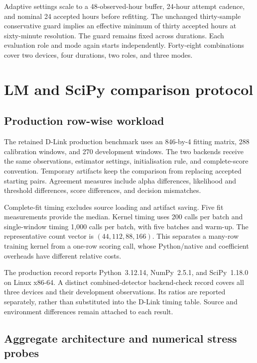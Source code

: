 Adaptive settings scale to a 48-observed-hour buffer, 24-hour attempt
cadence, and nominal 24 accepted hours before refitting. The unchanged
thirty-sample conservative guard implies an effective minimum of thirty
accepted hours at sixty-minute resolution. The guard remains fixed across
durations. Each evaluation role and mode again starts independently.
Forty-eight combinations cover two devices, four durations, two roles,
and three modes.

\section{LM and SciPy comparison protocol}
\label{sec:experimental-backends}

\subsection{Production row-wise workload}

The retained D-Link production benchmark uses an 846-by-4 fitting matrix,
288 calibration windows, and 270 development windows. The two backends
receive the same observations, estimator settings, initialisation rule,
and complete-score convention. Temporary artifacts keep the comparison
from replacing accepted starting pairs. Agreement measures include
alpha differences, likelihood and threshold differences, score
differences, and decision mismatches.

Complete-fit timing excludes source loading and artifact saving. Five
fit measurements provide the median. Kernel timing uses 200 calls per
batch and single-window timing 1,000 calls per batch, with five batches
and warm-up. The representative count vector is $(44,112,88,166)$.
This separates a many-row training kernel from a one-row scoring call,
whose Python/native and coefficient overheads have different relative
costs.

The production record reports Python~3.12.14, NumPy~2.5.1, and
SciPy~1.18.0 on Linux x86-64. A distinct combined-detector backend-check
record covers all three devices and their development observations.
Its ratios are reported separately, rather than substituted into the
D-Link timing table. Source and environment differences remain attached
to each result.

\subsection{Aggregate architecture and numerical stress probes}

